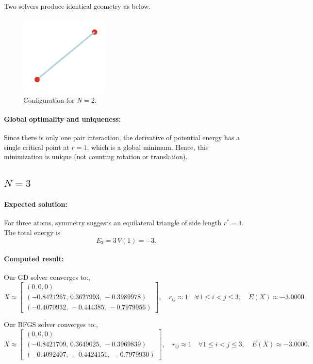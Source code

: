 \documentclass[11pt,onecolumn]{article}
\begin{document}
Two solvers produce identical geometry as below.
\begin{figure}[h]
  \centering
  \includegraphics[width=0.4\textwidth]{N2.png}
  \caption{Configuration for \(N=2\).}
\end{figure}

\paragraph{Global optimality and uniqueness:}  
Since there is only one pair interaction, the derivative of potential energy has a single critical point at \(r=1\), which is a global minimum.  Hence, this minimization is unique (not counting rotation or translation).

\subsection{\(N=3\)}

\paragraph{Expected solution:}  
For three atoms, symmetry suggests an equilateral triangle of side length \(r^*=1\).  The total energy is
\[
  E_3 = 3\,V(1) = -3.
\]

\paragraph{Computed result:}  
Our GD solver converges to:,
\[
  X \approx
  \begin{bmatrix}
    (0,0,0) \\[3pt]
    (-0.8421267,\,0.3627993,\,-0.3989978) \\[3pt]
    (-0.4070932,\,-0.444385,\,-0.7979956)
  \end{bmatrix}, \quad
  r_{ij} \approx 1 \quad \forall 1\leq i<j \leq3,
  \quad
  E(X) \approx -3.0000.
\]

Our BFGS solver converges to:,
\[
  X \approx
  \begin{bmatrix}
    (0,0,0) \\[3pt]
    (-0.8421709,\,0.3649025,\,-0.3969839) \\[3pt]
    (-0.4092407,\,-0.4424151,\,-0.7979930)
  \end{bmatrix}, \quad
  r_{ij} \approx 1 \quad \forall 1\leq i<j \leq3,
  \quad
  E(X) \approx -3.0000.
\]
\end{document}

